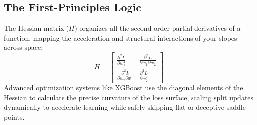 \documentclass[12pt,a4paper]{article}
\begin{document}
\subsection*{The First-Principles Logic}
The Hessian matrix ($H$) organizes all the second-order partial derivatives of a function, mapping the acceleration and structural interactions of your slopes across space:
$$H = \begin{bmatrix} \frac{\partial^2 L}{\partial w_1^2} & \frac{\partial^2 L}{\partial w_1 \partial w_2} \\ \frac{\partial^2 L}{\partial w_2 \partial w_1} & \frac{\partial^2 L}{\partial w_2^2} \end{bmatrix}$$
Advanced optimization systems like XGBoost use the diagonal elements of the Hessian to calculate the precise curvature of the loss surface, scaling split updates dynamically to accelerate learning while safely skipping flat or deceptive saddle points.
\end{document}
